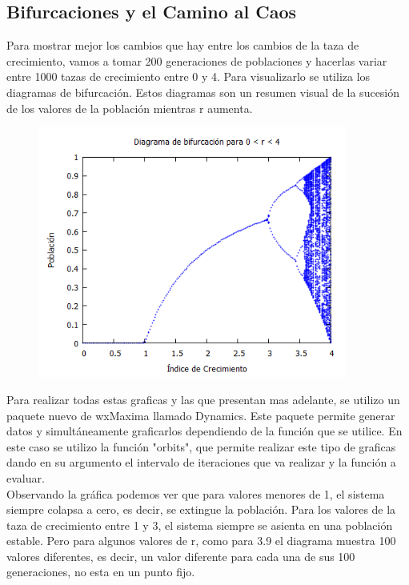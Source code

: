 \documentclass[12pt]{article}
\begin{document}
\subsection{Bifurcaciones y el Camino al Caos}
Para mostrar mejor los cambios que hay entre los cambios de la taza de crecimiento, vamos a tomar 200 generaciones de poblaciones y hacerlas variar entre 1000 tazas de crecimiento entre 0 y 4. Para visualizarlo se utiliza los diagramas de bifurcación. Estos diagramas son un resumen visual de la sucesión de los valores de la población mientras r aumenta.

\begin{figure}[h!]
    \centering
\includegraphics[width=4in]{Bif1.png}
\end{figure}

Para realizar todas estas graficas y las que presentan mas adelante, se utilizo un paquete nuevo de wxMaxima llamado Dynamics. Este paquete permite generar datos y simultáneamente graficarlos dependiendo de la función que se utilice. En este caso se utilizo la función "orbits", que permite realizar este tipo de graficas dando en su argumento el intervalo de iteraciones que va realizar y la función a evaluar. \\

Observando la gráfica podemos ver que para valores menores de 1, el sistema siempre colapsa a cero, es decir, se extingue la población. Para los valores de la taza de crecimiento entre 1 y 3, el sistema siempre se asienta en una población estable. Pero para algunos valores de r, como para 3.9 el diagrama muestra 100 valores diferentes, es decir, un valor diferente para cada una de sus 100 generaciones, no esta en un punto fijo. \\
\end{document}
